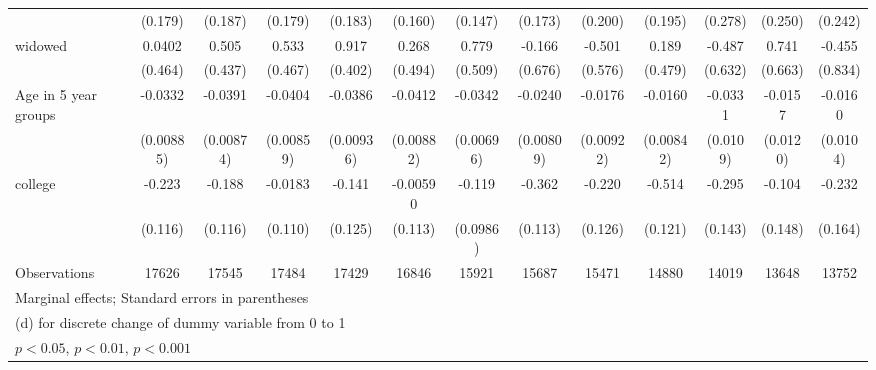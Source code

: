 {\begin{tabular}{l*{12}{c}}
                    &     (0.179)         &     (0.187)         &     (0.179)         &     (0.183)         &     (0.160)         &     (0.147)         &     (0.173)         &     (0.200)         &     (0.195)         &     (0.278)         &     (0.250)         &     (0.242)         \\
[1em]
widowed             &      0.0402         &       0.505         &       0.533         &       0.917\sym{*}  &       0.268         &       0.779         &      -0.166         &      -0.501         &       0.189         &      -0.487         &       0.741         &      -0.455         \\
                    &     (0.464)         &     (0.437)         &     (0.467)         &     (0.402)         &     (0.494)         &     (0.509)         &     (0.676)         &     (0.576)         &     (0.479)         &     (0.632)         &     (0.663)         &     (0.834)         \\
[1em]
Age in 5 year groups&     -0.0332\sym{***}&     -0.0391\sym{***}&     -0.0404\sym{***}&     -0.0386\sym{***}&     -0.0412\sym{***}&     -0.0342\sym{***}&     -0.0240\sym{**} &     -0.0176         &     -0.0160         &     -0.0331\sym{**} &     -0.0157         &     -0.0160         \\
                    &   (0.00885)         &   (0.00874)         &   (0.00859)         &   (0.00936)         &   (0.00882)         &   (0.00696)         &   (0.00809)         &   (0.00922)         &   (0.00842)         &    (0.0109)         &    (0.0120)         &    (0.0104)         \\
[1em]
college             &      -0.223         &      -0.188         &     -0.0183         &      -0.141         &    -0.00590         &      -0.119         &      -0.362\sym{**} &      -0.220         &      -0.514\sym{***}&      -0.295\sym{*}  &      -0.104         &      -0.232         \\
                    &     (0.116)         &     (0.116)         &     (0.110)         &     (0.125)         &     (0.113)         &    (0.0986)         &     (0.113)         &     (0.126)         &     (0.121)         &     (0.143)         &     (0.148)         &     (0.164)         \\
\hline
Observations        &       17626         &       17545         &       17484         &       17429         &       16846         &       15921         &       15687         &       15471         &       14880         &       14019         &       13648         &       13752         \\
\hline\hline
\multicolumn{13}{l}{\footnotesize Marginal effects; Standard errors in parentheses}\\
\multicolumn{13}{l}{\footnotesize  (d) for discrete change of dummy variable from 0 to 1}\\
\multicolumn{13}{l}{\footnotesize \sym{*} \(p<0.05\), \sym{**} \(p<0.01\), \sym{***} \(p<0.001\)}\\
\end{tabular}
}
